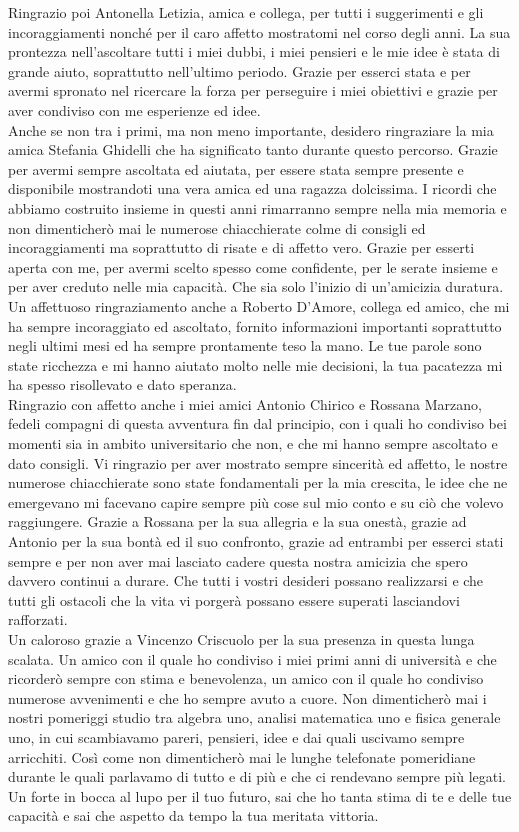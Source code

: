 \documentclass[12pt,a4paper,oneside]{book}
\begin{document}
Ringrazio poi Antonella Letizia, amica e collega, per tutti i suggerimenti e gli incoraggiamenti nonché per il caro affetto mostratomi nel corso degli anni. La sua prontezza nell'ascoltare tutti i miei dubbi, i miei pensieri e le mie idee è stata di grande aiuto, soprattutto nell'ultimo periodo. Grazie per esserci stata e per avermi spronato nel ricercare la forza per perseguire i miei obiettivi e grazie per aver condiviso con me esperienze ed idee.\\
Anche se non tra i primi, ma non meno importante, desidero ringraziare la mia amica Stefania Ghidelli che ha significato tanto durante questo percorso. Grazie per avermi sempre ascoltata ed aiutata, per essere stata sempre presente e disponibile mostrandoti una vera amica ed una ragazza dolcissima. I ricordi che abbiamo costruito insieme in questi anni rimarranno sempre nella mia memoria e non dimenticherò mai le numerose chiacchierate colme di consigli ed incoraggiamenti ma soprattutto di risate e di affetto vero. Grazie per esserti aperta con me, per avermi scelto spesso come confidente, per le serate insieme e per aver creduto nelle mia capacità. Che sia solo l'inizio di un'amicizia duratura.\\
Un affettuoso ringraziamento anche a Roberto D'Amore, collega ed amico, che mi ha sempre incoraggiato ed ascoltato, fornito informazioni importanti soprattutto negli ultimi mesi ed ha sempre prontamente teso la mano. Le tue parole sono state ricchezza e mi hanno aiutato molto nelle mie decisioni, la tua pacatezza mi ha spesso risollevato e dato speranza. \\
Ringrazio con affetto anche i miei amici Antonio Chirico e Rossana Marzano, fedeli compagni di questa avventura fin dal principio, con i quali ho condiviso bei momenti sia in ambito universitario che non, e che mi hanno sempre ascoltato e dato consigli. Vi ringrazio per aver mostrato sempre sincerità ed affetto, le nostre numerose chiacchierate sono state fondamentali per la mia crescita, le idee che ne emergevano mi facevano capire sempre più cose sul mio conto e su ciò che volevo raggiungere. Grazie a Rossana per la sua allegria e la sua onestà, grazie ad Antonio per la sua bontà ed il suo confronto, grazie ad entrambi per esserci stati sempre e per non aver mai lasciato cadere questa nostra amicizia che spero davvero continui a durare. Che tutti i vostri desideri possano realizzarsi e che tutti gli ostacoli che la vita vi porgerà possano essere superati lasciandovi rafforzati.\\
Un caloroso grazie a Vincenzo Criscuolo per la sua presenza in questa lunga scalata. Un amico con il quale ho condiviso i miei primi anni di università e che ricorderò sempre con stima e benevolenza, un amico con il quale ho condiviso numerose avvenimenti e che ho sempre avuto a cuore. Non dimenticherò mai i nostri pomeriggi studio tra algebra uno, analisi matematica uno e fisica generale uno, in cui scambiavamo pareri, pensieri, idee e dai quali uscivamo sempre arricchiti. Così come non dimenticherò mai le lunghe telefonate pomeridiane durante le quali parlavamo di tutto e di più e che ci rendevano sempre più legati. Un forte in bocca al lupo per il tuo futuro, sai che ho tanta stima di te e delle tue capacità e sai che aspetto da tempo la tua meritata vittoria.\\
\end{document}

